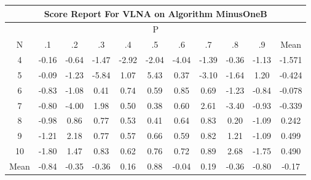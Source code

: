 \documentclass[11pt,a4paper]{report}
\begin{document}
\begin{longtable}{ | c || c | c | c | c | c | c | c | c | c || c |}
\hline
\multicolumn{11}{|c|}{ Score Report For VLNA on Algorithm MinusOneB} \\
\hline
\multicolumn{11}{|c|}{ P } \\
\hline
N & .1 & .2 & .3 & .4 & .5 & .6 & .7 & .8 & .9 & Mean\\
 \hline
 \hline
 \endhead
  4 &  \cellcolor[HTML]{FFF7F7} -0.16 &  \cellcolor[HTML]{FFEFEF} -0.64 &  \cellcolor[HTML]{FFD7D7} -1.47 &  \cellcolor[HTML]{FFB7B7} -2.92 &  \cellcolor[HTML]{FFCFCF} -2.04 &  \cellcolor[HTML]{FF9797} -4.04 &  \cellcolor[HTML]{FFDFDF} -1.39 &  \cellcolor[HTML]{FFF7F7} -0.36 &  \cellcolor[HTML]{FFDFDF} -1.13 & -1.571 \\
  5 &  \cellcolor[HTML]{FFFFFF} -0.09 &  \cellcolor[HTML]{FFDFDF} -1.23 &  \cellcolor[HTML]{FF7070} -5.84 &  \cellcolor[HTML]{E7E7FF} 1.07 &  \cellcolor[HTML]{7878FF} 5.43 &  \cellcolor[HTML]{F7F7FF} 0.37 &  \cellcolor[HTML]{FFAFAF} -3.10 &  \cellcolor[HTML]{FFD7D7} -1.64 &  \cellcolor[HTML]{DFDFFF} 1.20 & -0.424 \\
  6 &  \cellcolor[HTML]{FFE7E7} -0.83 &  \cellcolor[HTML]{FFE7E7} -1.08 &  \cellcolor[HTML]{F7F7FF} 0.41 &  \cellcolor[HTML]{EFEFFF} 0.74 &  \cellcolor[HTML]{EFEFFF} 0.59 &  \cellcolor[HTML]{E7E7FF} 0.85 &  \cellcolor[HTML]{EFEFFF} 0.69 &  \cellcolor[HTML]{FFDFDF} -1.23 &  \cellcolor[HTML]{FFE7E7} -0.84 & -0.078 \\
  7 &  \cellcolor[HTML]{FFE7E7} -0.80 &  \cellcolor[HTML]{FF9797} -4.00 &  \cellcolor[HTML]{CFCFFF} 1.98 &  \cellcolor[HTML]{EFEFFF} 0.50 &  \cellcolor[HTML]{F7F7FF} 0.38 &  \cellcolor[HTML]{EFEFFF} 0.60 &  \cellcolor[HTML]{BFBFFF} 2.61 &  \cellcolor[HTML]{FFA7A7} -3.40 &  \cellcolor[HTML]{FFE7E7} -0.93 & -0.339 \\
  8 &  \cellcolor[HTML]{FFE7E7} -0.98 &  \cellcolor[HTML]{E7E7FF} 0.86 &  \cellcolor[HTML]{EFEFFF} 0.77 &  \cellcolor[HTML]{EFEFFF} 0.53 &  \cellcolor[HTML]{F7F7FF} 0.41 &  \cellcolor[HTML]{EFEFFF} 0.64 &  \cellcolor[HTML]{E7E7FF} 0.83 &  \cellcolor[HTML]{F7F7FF} 0.20 &  \cellcolor[HTML]{FFE7E7} -1.09 & 0.242 \\
  9 &  \cellcolor[HTML]{FFDFDF} -1.21 &  \cellcolor[HTML]{C7C7FF} 2.18 &  \cellcolor[HTML]{EFEFFF} 0.77 &  \cellcolor[HTML]{EFEFFF} 0.57 &  \cellcolor[HTML]{EFEFFF} 0.66 &  \cellcolor[HTML]{EFEFFF} 0.59 &  \cellcolor[HTML]{E7E7FF} 0.82 &  \cellcolor[HTML]{DFDFFF} 1.21 &  \cellcolor[HTML]{FFE7E7} -1.09 & 0.499 \\
  10 &  \cellcolor[HTML]{FFCFCF} -1.80 &  \cellcolor[HTML]{D7D7FF} 1.47 &  \cellcolor[HTML]{E7E7FF} 0.83 &  \cellcolor[HTML]{EFEFFF} 0.62 &  \cellcolor[HTML]{EFEFFF} 0.76 &  \cellcolor[HTML]{EFEFFF} 0.72 &  \cellcolor[HTML]{E7E7FF} 0.89 &  \cellcolor[HTML]{BFBFFF} 2.68 &  \cellcolor[HTML]{FFCFCF} -1.75 & 0.490 \\
 \hline
 \hline
Mean &  \cellcolor[HTML]{FFE7E7} -0.84 &  \cellcolor[HTML]{FFF7F7} -0.35 &  \cellcolor[HTML]{FFF7F7} -0.36 &  \cellcolor[HTML]{F7F7FF} 0.16 &  \cellcolor[HTML]{E7E7FF} 0.88 &  \cellcolor[HTML]{FFFFFF} -0.04 &  \cellcolor[HTML]{F7F7FF} 0.19 &  \cellcolor[HTML]{FFF7F7} -0.36 &  \cellcolor[HTML]{FFE7E7} -0.80 &  \cellcolor[HTML]{FFF7F7} -0.17
\end{longtable}
\end{document}
